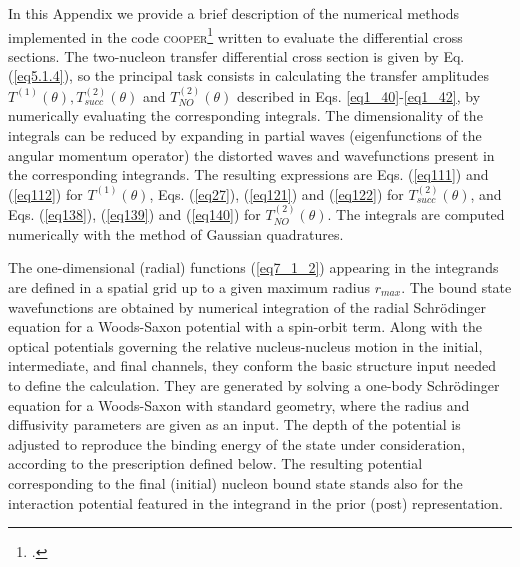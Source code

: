 \begin{subappendices}



In this Appendix we provide a brief description of the numerical methods implemented in the code \textsc{cooper}\footnote{\cite{Potel:12c}.} written to evaluate the differential cross sections. The two-nucleon transfer differential cross section is given by Eq. (\ref{eq5.1.4}),  so the principal task consists in calculating the transfer amplitudes $T^{(1)}(\theta),T^{(2)}_{succ}(\theta)$ and $T^{(2)}_{NO}(\theta)$ described in Eqs. \ref{eq1_40}-\ref{eq1_42}, by numerically evaluating the corresponding integrals.  The dimensionality of the integrals  can be reduced by expanding in partial waves (eigenfunctions of the angular momentum operator) the distorted waves and wavefunctions present in the corresponding integrands. The resulting expressions are Eqs. (\ref{eq111}) and (\ref{eq112}) for $T^{(1)}(\theta)$, Eqs. (\ref{eq27}), (\ref{eq121}) and (\ref{eq122}) for $T^{(2)}_{succ}(\theta)$, and Eqs. (\ref{eq138}), (\ref{eq139}) and (\ref{eq140}) for $T^{(2)}_{NO}(\theta)$. The integrals are computed numerically with the method of Gaussian quadratures. 


The one-dimensional (radial) functions (\ref{eq7_1_2}) appearing in the integrands are defined in a spatial grid up to a given maximum radius $r_{max}$. The bound state  wavefunctions are obtained by numerical integration of the radial Schr\"odinger equation for a Woods-Saxon potential with a spin-orbit term. Along with the optical potentials governing the relative nucleus-nucleus motion in the initial, intermediate, and final channels, they conform the basic structure input needed to define the calculation. They are generated by solving a one-body Schr\"odinger equation for a Woods-Saxon with standard geometry, where the radius and diffusivity parameters are given as an input. The depth of the potential is adjusted to reproduce the binding energy of the state under consideration, according to the prescription defined below. The resulting potential corresponding to the final (initial) nucleon bound state stands also for the interaction potential featured in the integrand in the prior (post) representation. 


\end{subappendices}
